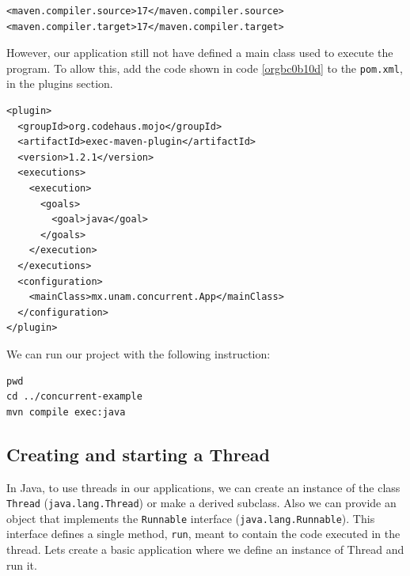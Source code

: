 \documentclass{latex/classes/thesis}
\begin{document}
\begin{lstlisting}
<maven.compiler.source>17</maven.compiler.source>
<maven.compiler.target>17</maven.compiler.target>
\end{lstlisting}

However, our application still not have defined a main class used to execute
the program. To allow this, add the code shown in code \ref{orgbc0b10d} to the \texttt{pom.xml},
in the plugins section.

\begin{lstlisting}
<plugin>
  <groupId>org.codehaus.mojo</groupId>
  <artifactId>exec-maven-plugin</artifactId>
  <version>1.2.1</version>
  <executions>
    <execution>
      <goals>
        <goal>java</goal>
      </goals>
    </execution>
  </executions>
  <configuration>
    <mainClass>mx.unam.concurrent.App</mainClass>
  </configuration>
</plugin>
\end{lstlisting}

We can run our project with the following instruction:

\begin{lstlisting}
pwd
cd ../concurrent-example
mvn compile exec:java
\end{lstlisting}


\subsection{Creating and starting a Thread}
\label{sec:org852dc4e}

In Java, to use threads in our applications, we can create an instance of the
class \texttt{Thread} (\texttt{java.lang.Thread}) or make a derived subclass. Also we can
provide an object that implements the \texttt{Runnable} interface
(\texttt{java.lang.Runnable}). This interface defines a single method, \texttt{run}, meant to
contain the code executed in the thread. Lets create a basic application
where we define an instance of Thread and run it.
\end{document}

